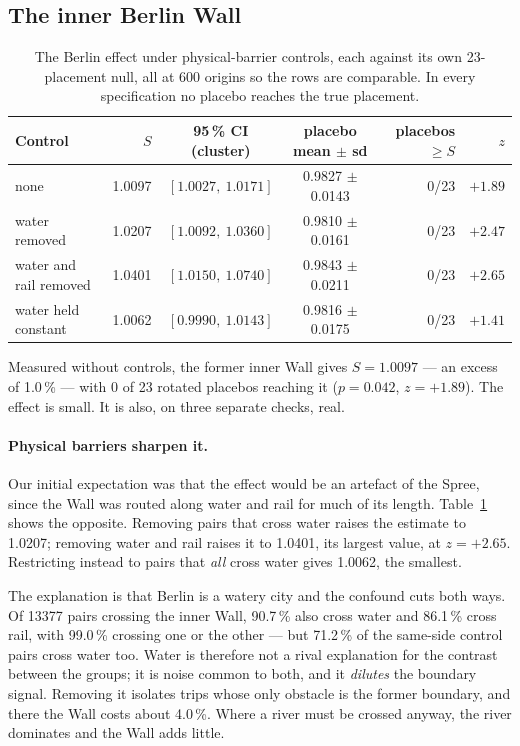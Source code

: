 \documentclass[11pt,a4paper]{article}
\begin{document}
\subsection{The inner Berlin Wall}

\begin{table}[t]
\centering
\small
\begin{tabular}{lrccrr}
\toprule
Control & $S$ & 95\,\% CI (cluster) & placebo mean $\pm$ sd & placebos $\ge S$ & $z$ \\
\midrule
none                    & 1.0097 & $[1.0027,\ 1.0171]$ & 0.9827 $\pm$ 0.0143 & 0/23 & $+1.89$ \\
water removed           & 1.0207   & $[1.0092,\ 1.0360]$     & 0.9810 $\pm$ 0.0161     & 0/23   & $+2.47$ \\
water and rail removed  & 1.0401  & $[1.0150,\ 1.0740]$   & 0.9843 $\pm$ 0.0211   & 0/23  & $+2.65$ \\
water held constant     & 1.0062   & $[0.9990,\ 1.0143]$     & 0.9816 $\pm$ 0.0175     & 0/23   & $+1.41$ \\
\bottomrule
\end{tabular}
\caption{The Berlin effect under physical-barrier controls, each against its own
23-placement null, all at 600 origins so the rows are
comparable. In every specification no placebo reaches the true placement.}
\label{tab:controls}
\end{table}

Measured without controls, the former inner Wall gives $S = 1.0097$ ---
an excess of 1.0\,\% --- with 0 of 23 rotated
placebos reaching it ($p = 0.042$, $z = +1.89$). The effect is small. It
is also, on three separate checks, real.

\paragraph{Physical barriers sharpen it.} Our initial expectation was that the
effect would be an artefact of the Spree, since the Wall was routed along water
and rail for much of its length. Table~\ref{tab:controls} shows the opposite.
Removing pairs that cross water raises the estimate to 1.0207; removing
water and rail raises it to 1.0401, its largest value, at $z =
+2.65$. Restricting instead to pairs that \emph{all} cross water gives
1.0062, the smallest.

The explanation is that Berlin is a watery city and the confound cuts both ways.
Of 13377 pairs crossing the inner Wall, 90.7\,\%
also cross water and 86.1\,\% cross rail, with
99.0\,\% crossing one or the other --- but
71.2\,\% of the same-side control pairs cross water too.
Water is therefore not a rival explanation for the contrast between the groups;
it is noise common to both, and it \emph{dilutes} the boundary signal. Removing
it isolates trips whose only obstacle is the former boundary, and there the Wall
costs about 4.0\,\%. Where a river must be crossed anyway, the river
dominates and the Wall adds little.
\end{document}
